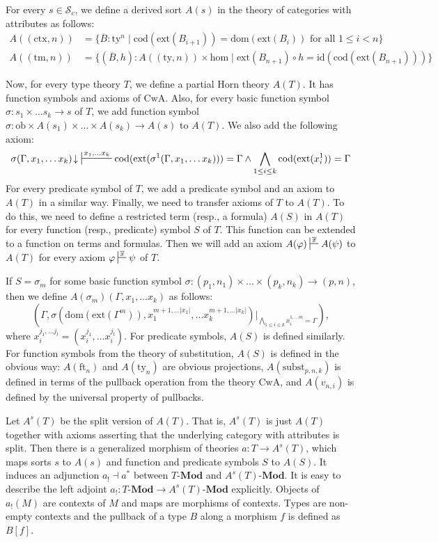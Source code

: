 \documentclass[reqno]{amsart}
\theoremstyle{definition}
\theoremstyle{remark}
\newcommand{\fs}[1]{\mathrm{#1}}
\newcommand{\bcat}[1]{\mathbf{#1}}
\newcommand{\Mod}[1]{#1\text{-}\bcat{Mod}}
\numberwithin{figure}{section}
\begin{document}
For every $s \in \mathcal{S}_c$, we define a derived sort $A(s)$ in the theory of categories with attributes as follows:
\begin{align*}
A((\fs{ctx},n)) & = \{ \overline{B} : \fs{ty}^n \mid \fs{cod}(\fs{ext}(B_{i+1})) = \fs{dom}(\fs{ext}(B_i)) \text{ for all } 1 \leq i < n \} \\
A((\fs{tm},n)) & = \{ (\overline{B}, h) : A((\fs{ty},n)) \times \fs{hom} \mid \fs{ext}(B_{n+1}) \circ h = \fs{id}(\fs{cod}(\fs{ext}(B_{n+1}))) \}
\end{align*}

Now, for every type theory $T$, we define a partial Horn theory $A(T)$.
It has function symbols and axioms of $\fs{CwA}$.
Also, for every basic function symbol $\sigma : s_1 \times \ldots s_k \to s$ of $T$, we add function symbol $\sigma : \fs{ob} \times A(s_1) \times \ldots \times A(s_k) \to A(s)$ to $A(T)$.
We also add the following axiom:
\[ \sigma(\Gamma, x_1, \ldots x_k)\!\downarrow\ \sststile{}{x_1, \ldots x_k} \fs{cod}(\fs{ext}(\sigma^1(\Gamma, x_1, \ldots x_k))) = \Gamma \land \bigwedge_{1 \leq i \leq k} \fs{cod}(\fs{ext}(x_i^1)) = \Gamma \]
For every predicate symbol of $T$, we add a predicate symbol and an axiom to $A(T)$ in a similar way.
Finally, we need to transfer axioms of $T$ to $A(T)$.
To do this, we need to define a restricted term (resp., a formula) $A(S)$ in $A(T)$ for every function (resp., predicate) symbol $S$ of $T$.
This function can be extended to a function on terms and formulas.
Then we will add an axiom $A(\varphi) \sststile{}{\overline{x}} A(\psi)$ to $A(T)$ for every axiom $\varphi \sststile{}{\overline{x}} \psi$ of $T$.

If $S = \sigma_m$ for some basic function symbol $\sigma : (p_1,n_1) \times \ldots \times (p_k,n_k) \to (p,n)$, then we define $A(\sigma_m)(\Gamma, x_1, \ldots x_k)$ as follows:
\[ (\Gamma, \sigma(\fs{dom}(\fs{ext}(\Gamma^m)), x_1^{m+1, \ldots |x_1|}, \ldots x_k^{m+1, \ldots |x_k|})|_{\bigwedge_{1 \leq i \leq k} x_i^{1, \ldots m} = \Gamma}), \]
where $x_i^{j_1, \ldots j_l} = (x_i^{j_1}, \ldots x_i^{j_l})$.
For predicate symbols, $A(S)$ is defined similarly.
For function symbols from the theory of substitution, $A(S)$ is defined in the obvious way: $A(\fs{ft}_n)$ and $A(\fs{ty}_n)$ are obvious projections,
$A(\fs{subst}_{p,n,k})$ is defined in terms of the pullback operation from the theory $\fs{CwA}$, and $A(v_{n,i})$ is defined by the universal property of pullbacks.

Let $A^s(T)$ be the split version of $A(T)$.
That is, $A^s(T)$ is just $A(T)$ together with axioms asserting that the underlying category with attributes is split.
Then there is a generalized morphism of theories $a : T \to A^s(T)$, which maps sorts $s$ to $A(s)$ and function and predicate symbols $S$ to $A(S)$.
It induces an adjunction $a_! \dashv a^*$ between $\Mod{T}$ and $\Mod{A^s(T)}$.
It is easy to describe the left adjoint $a_! : \Mod{T} \to \Mod{A^s(T)}$ explicitly.
Objects of $a_!(M)$ are contexts of $M$ and maps are morphisms of contexts.
Types are non-empty contexts and the pullback of a type $B$ along a morphism $f$ is defined as $B[f]$.
\end{document}
